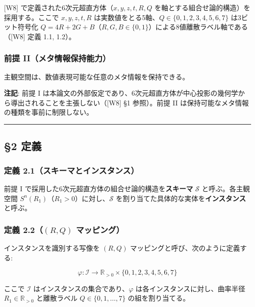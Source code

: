 \documentclass[
  a4paper,11pt]{ltjsarticle}
\theoremstyle{definition}
\theoremstyle{remark}
\begin{document}
{[}W8{]} で定義された6次元超直方体（\(x, y, z, t, R, Q\)
を軸とする組合せ論的構造）を採用する。ここで \(x, y, z, t, R\)
は実数値をとる5軸、\(Q \in \{0, 1, 2, 3, 4, 5, 6, 7\}\) は3ビット符号化
\(Q = 4R + 2G + B\)（\(R, G, B \in \{0, 1\}\)）による8値離散ラベル軸である（{[}W8{]}
定義 1.1, 1.2）。

\subsubsection{前提
II（メタ情報保持能力）}\label{ux524dux63d0-iiux30e1ux30bfux60c5ux5831ux4fddux6301ux80fdux529b}

主観空間は、数値表現可能な任意のメタ情報を保持できる。

\textbf{注記}: 前提 I
は本論文の外部仮定であり、6次元超直方体が中心投影の幾何学から導出されることを主張しない（{[}W8{]}
§1 参照）。前提 II は保持可能なメタ情報の種類を事前に制限しない。

\begin{center}\rule{0.5\linewidth}{0.5pt}\end{center}

\subsection{§2 定義}\label{ux5b9aux7fa9}

\subsubsection{定義
2.1（スキーマとインスタンス）}\label{ux5b9aux7fa9-2.1ux30b9ux30adux30fcux30deux3068ux30a4ux30f3ux30b9ux30bfux30f3ux30b9}

前提 I で採用した6次元超直方体の組合せ論的構造を\textbf{スキーマ}
\(\mathcal{S}\) と呼ぶ。各主観空間
\(S^n(R_1)\)（\(R_1 > 0\)）に対し、\(\mathcal{S}\)
を割り当てた具体的な実体を\textbf{インスタンス}と呼ぶ。

\subsubsection{\texorpdfstring{定義 2.2（\((R, Q)\)
マッピング）}{定義 2.2（(R, Q) マッピング）}}\label{ux5b9aux7fa9-2.2r-q-ux30deux30c3ux30d4ux30f3ux30b0}

インスタンスを識別する写像を \((R, Q)\)
マッピングと呼び、次のように定義する:

\[
\varphi : \mathcal{I} \to \mathbb{R}_{> 0} \times \{0, 1, 2, 3, 4, 5, 6, 7\}
\]

ここで \(\mathcal{I}\) はインスタンスの集合であり、\(\varphi\)
は各インスタンスに対し、曲率半径 \(R_1 \in \mathbb{R}_{> 0}\)
と離散ラベル \(Q \in \{0, 1, \ldots, 7\}\) の組を割り当てる。
\end{document}
